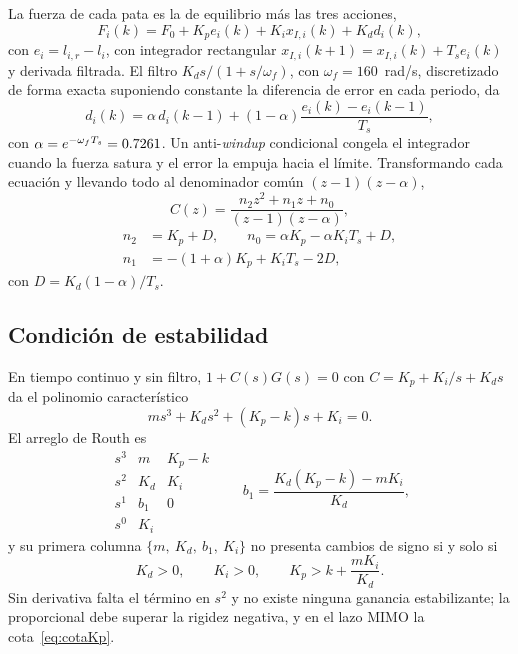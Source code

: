 \documentclass[conference]{IEEEtran}
\begin{document}
La fuerza de cada pata es la de equilibrio más las tres acciones,
\begin{equation}
F_i(k) = F_0 + K_pe_i(k) + K_ix_{I,i}(k) + K_dd_i(k),
\end{equation}
con $e_i = l_{i,r} - l_i$,
con integrador rectangular $x_{I,i}(k+1) = x_{I,i}(k) + T_se_i(k)$ y derivada filtrada. El filtro $K_ds/(1 + s/\omega_f)$, con $\omega_f = 160$~rad/s, discretizado de forma exacta suponiendo constante la diferencia de error en cada periodo, da
\begin{equation}
d_i(k) = \alpha\,d_i(k-1) + (1 - \alpha)\frac{e_i(k) - e_i(k-1)}{T_s},
\end{equation}
con $\alpha = e^{-\omega_fT_s} = 0.7261$.
Un anti-\textit{windup} condicional congela el integrador cuando la fuerza satura y el error la empuja hacia el límite. Transformando cada ecuación y llevando todo al denominador común $(z - 1)(z - \alpha)$,
\begin{equation}
C(z) = \frac{n_2z^2 + n_1z + n_0}{(z - 1)(z - \alpha)},
\end{equation}
\begin{equation*}
\begin{aligned}
n_2 &= K_p + D,\qquad n_0 = \alpha K_p - \alpha K_iT_s + D,\\
n_1 &= -(1 + \alpha)K_p + K_iT_s - 2D,
\end{aligned}
\end{equation*}
con $D = K_d(1 - \alpha)/T_s$.

\subsection{Condición de estabilidad}

En tiempo continuo y sin filtro, $1 + C(s)G(s) = 0$ con $C = K_p + K_i/s + K_ds$ da el polinomio característico
\begin{equation}
ms^3 + K_ds^2 + (K_p - k)s + K_i = 0 .
\end{equation}
El arreglo de Routh es
\begin{equation}
\begin{array}{c|cc}
s^3 & m & K_p - k\\
s^2 & K_d & K_i\\
s^1 & b_1 & 0\\
s^0 & K_i &
\end{array}\qquad b_1 = \frac{K_d(K_p - k) - mK_i}{K_d},
\end{equation}
y su primera columna $\{m,\ K_d,\ b_1,\ K_i\}$ no presenta cambios de signo si y solo si
\begin{equation}
K_d > 0,\qquad K_i > 0,\qquad K_p > k + \frac{mK_i}{K_d} .
\label{eq:routh}
\end{equation}
Sin derivativa falta el término en $s^2$ y no existe ninguna ganancia estabilizante; la proporcional debe superar la rigidez negativa, y en el lazo MIMO la cota~\eqref{eq:cotaKp}.
\end{document}
